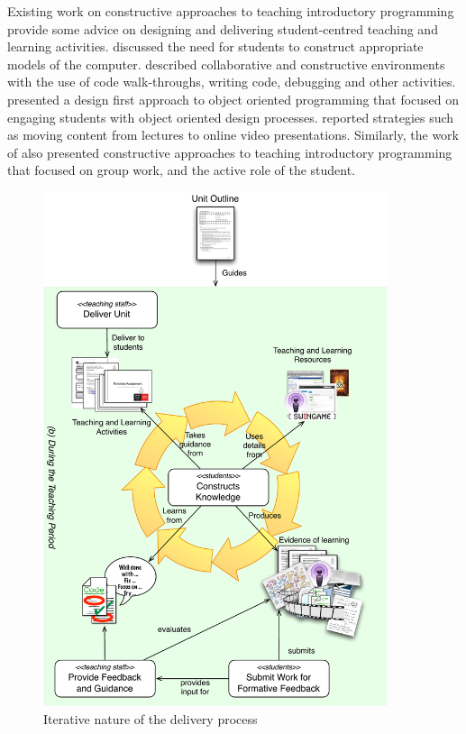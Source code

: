 Existing work on constructive approaches to teaching introductory programming provide some advice on designing and delivering student-centred teaching and learning activities. \citet{BenAri:1998,BenAri:2001} discussed the need for students to construct appropriate models of the computer. \citet{VanGorp:2001} described collaborative and constructive environments with the use of code walk-throughs, writing code, debugging and other activities. \citet{Thramboulidis:2003} presented a design first approach to object oriented programming that focused on engaging students with object oriented design processes. \citet{Wulf:2005} reported strategies such as moving content from lectures to online video presentations. Similarly, the work of \citet{Thota:2010} also presented constructive approaches to teaching introductory programming that focused on group work, and the active role of the student.

\begin{figure}[p]
	\centering
	\includegraphics[width=0.9\textwidth]{DeliverUnit}
	\caption{Iterative nature of the delivery process}
	\label{fig:deliver_unit}
\end{figure}


